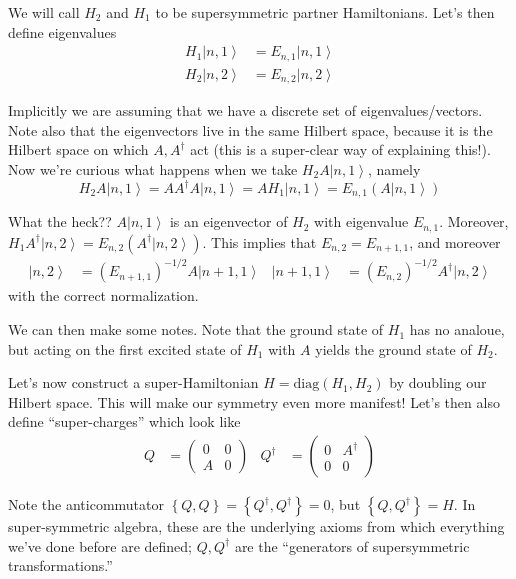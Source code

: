 \documentclass[10pt]{report}
\newcommand{\ket}[1]{\left|#1\right>}
\begin{document}
We will call $H_2$ and $H_1$ to be supersymmetric partner Hamiltonians. Let's then define eigenvalues
\begin{align}
    H_1\ket{n,1} &= E_{n,1}\ket{n,1}\\
    H_2\ket{n,2} &= E_{n,2}\ket{n,2}
\end{align}

Implicitly we are assuming that we have a discrete set of eigenvalues/vectors. Note also that the eigenvectors live in the same Hilbert space, because it is the Hilbert space on which $A, A^\dagger$ act (this is a super-clear way of explaining this!). Now we're curious what happens when we take $H_2A\ket{n,1}$, namely
\begin{equation}
    H_2A\ket{n,1} = AA^\dagger A\ket{n,1} = AH_1\ket{n,1} = E_{n,1}(A\ket{n,1})
\end{equation}

What the heck?? $A\ket{n,1}$ is an eigenvector of $H_2$ with eigenvalue $E_{n,1}$. Moreover, $H_1A^\dagger\ket{n,2} = E_{n,2}(A^\dagger\ket{n,2})$. This implies that $E_{n,2} = E_{n+1,1}$, and moreover
\begin{align}
    \ket{n,2} &= \left( E_{n+1,1} \right)^{-1/2}A\ket{n+1,1} & \ket{n+1,1} &= \left( E_{n,2} \right)^{-1/2}A^\dagger\ket{n,2}
\end{align}
with the correct normalization. 

We can then make some notes. Note that the ground state of $H_1$ has no analoue, but acting on the first excited state of $H_1$ with $A$ yields the ground state of $H_2$. 

Let's now construct a super-Hamiltonian $H = \mathrm{diag}(H_1, H_2)$ by doubling our Hilbert space. This will make our symmetry even more manifest! Let's then also define ``super-charges'' which look like
\begin{align}
    Q &= \begin{pmatrix} 0 & 0 \\A & 0 \end{pmatrix} & Q^\dagger &= \begin{pmatrix} 0 & A^\dagger \\ 0 & 0 \end{pmatrix} 
\end{align}

Note the anticommutator $\left\{ Q,Q \right\} = \left\{ Q^\dagger, Q^\dagger \right\} = 0$, but $\left\{ Q, Q^\dagger \right\} = H$. In super-symmetric algebra, these are the underlying axioms from which everything we've done before are defined; $Q, Q^\dagger$ are the ``generators of supersymmetric transformations.''
\end{document}
